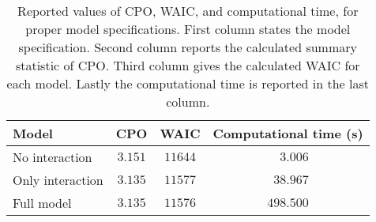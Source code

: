 \begin{table}

\caption{\label{tab:proper-results}Reported values of CPO, WAIC, and computational time,
           for proper model specifications.
          First column states the model specification.
          Second column reports the calculated summary statistic of CPO.
          Third column gives the calculated WAIC for each model.
          Lastly the computational time is reported in the last column.}
\centering
\begin{tabular}{lccc}
\hline
Model  & CPO & WAIC & \multicolumn{1}{c}{Computational time (s)} \\ 
\hline
No interaction  & $3.151$ & $11644$ & $\phantom{00}3.006$ \\
Only interaction  & $3.135$ & $11577$ & $\phantom{0}38.967$ \\
Full model  & $3.135$ & $11576$ & $498.500$ \\
\hline 
\end{tabular}


\end{table}
